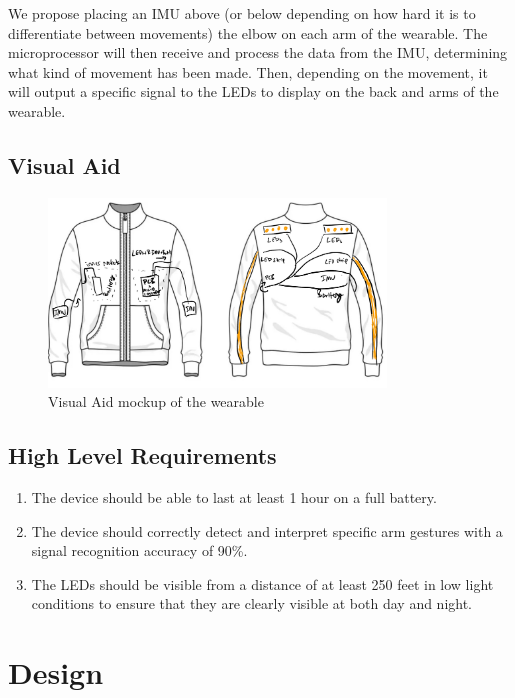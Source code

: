 \documentclass[12pt]{article}
\begin{document}
We propose placing an IMU above (or below depending on how hard 
it is to differentiate between movements) the elbow on each arm 
of the wearable. The microprocessor will then receive and process 
the data from the IMU, determining what kind of movement has been 
made. Then, depending on the movement, it will output a specific 
signal to the LEDs to display on the back and arms of the wearable. 


\subsection{Visual Aid}
\begin{figure}[ht]
    \centering
    \includegraphics[width=0.8\textwidth]{visual_aid.jpeg}
    \caption{Visual Aid mockup of the wearable}
    \label{fig:my_label}
\end{figure}
\subsection{High Level Requirements}
\begin{enumerate}
    \item The device should be able to last at least 1 hour on a full battery.
    \item The device should correctly detect and interpret specific arm 
    gestures with a signal recognition accuracy of 90\%. 
    \item The LEDs should be visible from a distance of at least 
    250 feet in low light conditions to ensure that they are clearly visible at both day and night. 
\end{enumerate}
\newpage
\section{Design}
\end{document}
